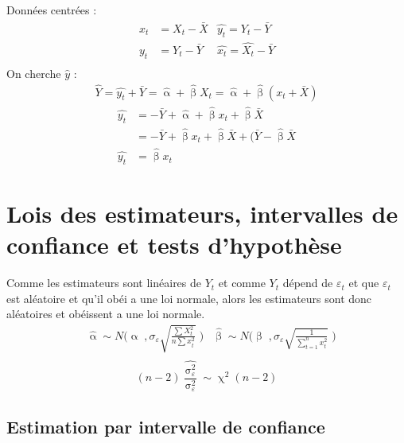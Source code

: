 \documentclass{article}
\newcommand{\hbeta}{\hat{\upbeta}}
\newcommand{\halpha}{\hat{\upalpha}}
\newcommand{\et}{\varepsilon_t}
\newcommand{\sumt}{\sum\limits_{t=1}^n}
\newcommand{\sig}{\upsigma_\varepsilon^2}
\begin{document}
Données centrées : 
\begin{align*}
	x_t &= X_t - \bar{X} &\hat{y_t} = \hat{Y_t} - \bar{Y}\\
	y_t &= Y_t - \bar{Y} &\hat{x_t} = \hat{X_t} - \bar{Y}\\
\end{align*}
On cherche \(\hat{y} \) :
\begin{align*}
	\hat{Y} = \hat{y_t} + \bar{Y} = \hat{\upalpha} + \hat{\upbeta} X_t  = \hat{\upalpha} + \hat{\upbeta} (x_t + \bar{X})	
\end{align*} 
\begin{align*}
	\hat{y_t} &= - \bar{Y} + \halpha + \hbeta x_t + \hbeta \bar{X} \\
	&= - \bar{Y} + \hbeta x_t + \hbeta \bar{X} + (\bar{Y} - \hbeta \bar{X} \\
	\hat{y_t} &= \hbeta x_t
\end{align*}

\section{Lois des estimateurs, intervalles de confiance et tests d'hypothèse}
Comme les estimateurs sont linéaires de \(Y_t\) et comme \(Y_t\) dépend de \(\et\) et que \(\et\) est aléatoire et qu'il obéi a une loi normale, alors les estimateurs sont donc aléatoires et obéissent a une loi normale.
\begin{align*}
	& \halpha \sim N \Bigg(\upalpha \; , \sigma_\varepsilon \sqrt{\frac{\sum X^2_t}{n \sum x_t^2 }} \; \Bigg) &\hbeta \sim N \Bigg( \upbeta \; , \sigma_\varepsilon \sqrt{\frac{1}{\sumt x_t^2}} \; \Bigg) \\
\end{align*}
\[(n-2) \frac{\hat{\sig}}{\sig} \sim \upchi^2 (n-2)\]

\subsection{Estimation par intervalle de confiance}
\end{document}
